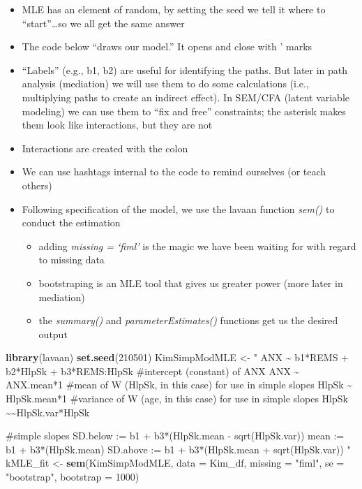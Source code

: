 \documentclass[
  11pt,
]{book}
\newenvironment{Shaded}{\begin{snugshade}}{\end{snugshade}}
\newcommand{\AttributeTok}[1]{\textcolor[rgb]{0.27,0.27,0.27}{#1}}
\newcommand{\DecValTok}[1]{\textcolor[rgb]{0.06,0.06,0.06}{#1}}
\newcommand{\FunctionTok}[1]{\textcolor[rgb]{0.27,0.27,0.27}{\textbf{#1}}}
\newcommand{\NormalTok}[1]{#1}
\newcommand{\OtherTok}[1]{\textcolor[rgb]{0.37,0.37,0.37}{#1}}
\newcommand{\StringTok}[1]{\textcolor[rgb]{0.5,0.5,0.5}{#1}}
\providecommand{\tightlist}{%
  \setlength{\itemsep}{0pt}\setlength{\parskip}{0pt}}
\begin{document}
\begin{itemize}
\tightlist
\item
  MLE has an element of random, by setting the seed we tell it where to ``start''\ldots so we all get the same answer
\item
  The code below ``draws our model.'' It opens and close with ' marks
\item
  ``Labels'' (e.g., b1, b2) are useful for identifying the paths. But later in path analysis (mediation) we will use them to do some calculations (i.e., multiplying paths to create an indirect effect). In SEM/CFA (latent variable modeling) we can use them to ``fix and free'' constraints; the asterisk makes them look like interactions, but they are not
\item
  Interactions are created with the colon
\item
  We can use hashtags internal to the code to remind ourselves (or teach others)
\item
  Following specification of the model, we use the lavaan function \emph{sem()} to conduct the estimation

  \begin{itemize}
  \tightlist
  \item
    adding \emph{missing = `fiml'} is the magic we have been waiting for with regard to missing data
  \item
    bootstraping is an MLE tool that gives us greater power (more later in mediation)
  \item
    the \emph{summary()} and \emph{parameterEstimates()} functions get us the desired output
  \end{itemize}
\end{itemize}

\begin{Shaded}
\begin{Highlighting}[]
\FunctionTok{library}\NormalTok{(lavaan)}
\FunctionTok{set.seed}\NormalTok{(}\DecValTok{210501}\NormalTok{)}
\NormalTok{KimSimpModMLE }\OtherTok{\textless{}{-}} \StringTok{"}
\StringTok{    ANX \textasciitilde{} b1*REMS + b2*HlpSk + b3*REMS:HlpSk}
\StringTok{    \#intercept (constant) of ANX}
\StringTok{    ANX \textasciitilde{} ANX.mean*1}
\StringTok{    \#mean of W (HlpSk, in this case) for use in simple slopes}
\StringTok{    HlpSk \textasciitilde{} HlpSk.mean*1}
\StringTok{    \#variance of W (age, in this case) for use in simple slopes}
\StringTok{    HlpSk \textasciitilde{}\textasciitilde{}HlpSk.var*HlpSk}

\StringTok{    \#simple slopes}
\StringTok{    SD.below := b1 + b3*(HlpSk.mean {-} sqrt(HlpSk.var))}
\StringTok{    mean := b1 + b3*(HlpSk.mean)}
\StringTok{    SD.above := b1 + b3*(HlpSk.mean + sqrt(HlpSk.var))}
\StringTok{"}
\NormalTok{kMLE\_fit }\OtherTok{\textless{}{-}} \FunctionTok{sem}\NormalTok{(KimSimpModMLE, }\AttributeTok{data =}\NormalTok{ Kim\_df, }\AttributeTok{missing =} \StringTok{"fiml"}\NormalTok{, }\AttributeTok{se =} \StringTok{"bootstrap"}\NormalTok{,}
    \AttributeTok{bootstrap =} \DecValTok{1000}\NormalTok{)}
\end{Highlighting}
\end{Shaded}
\end{document}

